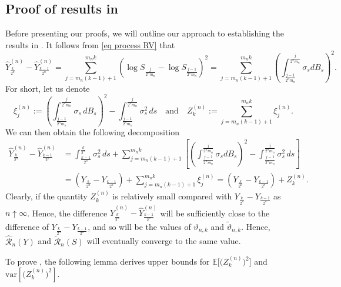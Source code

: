 \documentclass[12pt,reqno]{article}
\def\ua{\uparrow}
\def\wh{\widehat}
\def\wt{\widetilde}
\numberwithin{equation}{section}
\def\var{\mbox{var}}
\def\cR{{\mathscr R}}
\theoremstyle{definition}
\def\wt#1{\widetilde{#1}}
\def\ua{\uparrow}
\def\wh{\widehat}
\def\wt{\widetilde}
\newcommand{\bE}{\mathbb{E}}
\begin{document}
\subsection{Proof of results in }
Before presenting our proofs, we will outline our approach to establishing the results in . It follows from \eqref{eq process RV} that
\begin{equation*}
	\wh Y^{(n)}_{\frac{k}{2^n}} - \wh Y^{(n)}_{\frac{k-1}{2^n}} = \sum_{j = m_n(k-1)+1}^{m_n k} \left(\log S_{\frac{j}{2^n m_n}} - \log S_{\frac{j-1}{2^n m_n}} \right)^2 =  \sum_{j = m_n(k-1)+1}^{m_n k} \left(\int^{\frac{j}{2^n m_n}}_{\frac{j-1}{2^n m_n}}\sigma_s dB_s\right)^2.
\end{equation*}
For short, let us denote 
\begin{equation*}
	\xi^{(n)}_{j} := \left(\int^{\frac{j}{2^n m_n}}_{\frac{j-1}{2^n m_n}}\sigma_s \,dB_s\right)^2 - \int^{\frac{j}{2^n m_n}}_{\frac{j-1}{2^n m_n}}\sigma^2_s\,ds \quad \text{and} \quad Z^{(n)}_k := \sum_{j = m_n(k-1)+1}^{m_n k}\xi^{(n)}_{j}.
\end{equation*}
We can then obtain the following decomposition
\begin{equation*}
	\begin{split}
		\wh Y^{(n)}_{\frac{k}{2^n}} - \wh Y^{(n)}_{\frac{k-1}{2^n}} &= \int_{\frac{k-1}{2^n}}^{\frac{k}{2^n}} \sigma^2_s \,ds + \sum_{j = m_n(k-1)+1}^{m_n k} \left[\left(\int^{\frac{j}{2^n m_n}}_{\frac{j-1}{2^n m_n}}\sigma_s dB_s\right)^2 - \int^{\frac{j}{2^n m_n}}_{\frac{j-1}{2^n m_n}}\sigma^2_s \,ds\right]\\&= \left(Y_{\frac{k}{2^n}} - Y_{\frac{k-1}{2^n}}\right) + \sum_{j = m_n(k-1)+1}^{m_n k} \xi^{(n)}_j = \left(Y_{\frac{k}{2^n}} - Y_{\frac{k-1}{2^n}}\right) + Z^{(n)}_k.
	\end{split}
\end{equation*}
Clearly, if the quantity $Z^{(n)}_k$ is relatively small compared with $Y_{\frac{k}{2^n}} - Y_{\frac{k-1}{2^n}}$ as $n \ua \infty$. Hence,  the difference $\wh Y^{(n)}_{\frac{k}{2^n}} - \wh Y^{(n)}_{\frac{k-1}{2^n}}$ will be sufficiently close to the difference of $Y_{\frac{k}{2^n}} - Y_{\frac{k-1}{2^n}}$, and so will be  the values of $\vartheta_{n,k}$ and $\wt \vartheta_{n,k}$. Hence,  $\wh \cR_n(Y)$ and $\wt \cR_n(S)$ will eventually converge to the same value. 


To prove , the following lemma derives upper bounds for $\bE\big[\big(Z^{(n)}_{k}\big)^2\big]$ and $\var[\big(Z^{(n)}_{k}\big)^2]$. 
\end{document}
